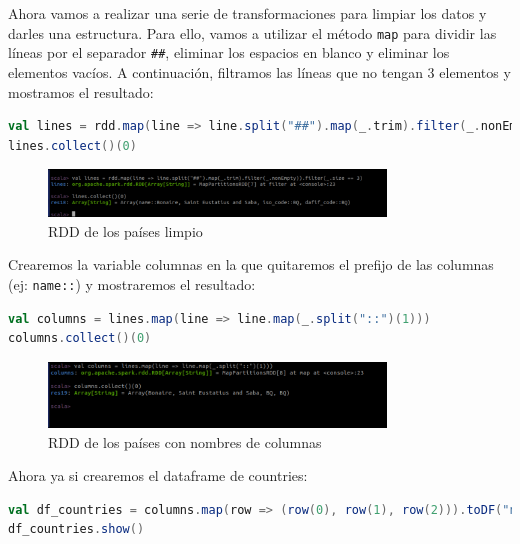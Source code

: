Ahora vamos a realizar una serie de transformaciones para limpiar los datos y darles una estructura. Para ello, vamos a utilizar el método \texttt{map} para dividir las líneas por el separador \texttt{\#\#}, eliminar los espacios en blanco y eliminar los elementos vacíos. A continuación, filtramos las líneas que no tengan 3 elementos y mostramos el resultado:

\begin{lstlisting}[language=scala]
val lines = rdd.map(line => line.split("##").map(_.trim).filter(_.nonEmpty)).filter(_.size == 3)
lines.collect()(0)
\end{lstlisting}

\begin{figure}[H]
    \centering
    \includegraphics[width=0.8\textwidth]{figures/26.png}
    \caption{RDD de los países limpio}
    \label{fig:countries_rdd_clean}
\end{figure}

Crearemos la variable columnas en la que quitaremos el prefijo de las columnas (ej: \texttt{name::}) y mostraremos el resultado:

\begin{lstlisting}[language=scala]
val columns = lines.map(line => line.map(_.split("::")(1)))
columns.collect()(0)
\end{lstlisting}

\begin{figure}[H]
    \centering
    \includegraphics[width=0.8\textwidth]{figures/27.png}
    \caption{RDD de los países con nombres de columnas}
    \label{fig:countries_rdd_columns}
\end{figure}

Ahora ya si crearemos el dataframe de countries:

\begin{lstlisting}[language=scala]
val df_countries = columns.map(row => (row(0), row(1), row(2))).toDF("name", "iso_code", "dafif_code")
df_countries.show()
\end{lstlisting}

